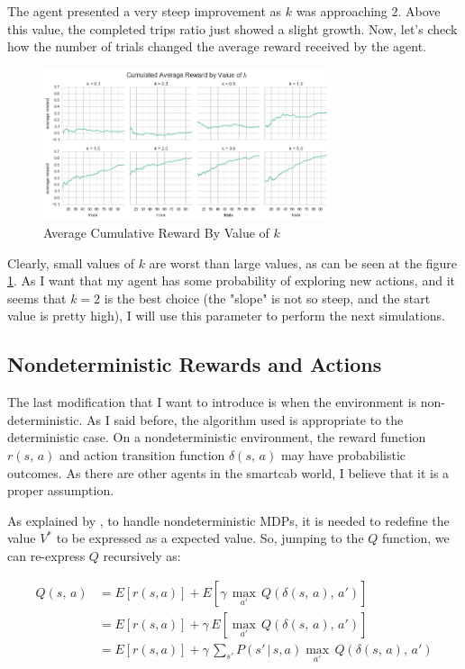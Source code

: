 \documentclass[a4paper]{article}
\begin{document}
\newpage
The agent presented a very steep improvement as $k$ was approaching $2$. Above this value, the completed trips ratio just showed a slight growth. Now, let's check how the number of trials changed the average reward received by the agent.

\begin{figure}[ht!]
\centering
\includegraphics[width=0.75\textwidth]{images/cum_reward_by_k.png}
\caption{\label{fig:cum_reward_by_k}Average Cumulative Reward By Value of $k$}
\end{figure}

Clearly, small values of $k$ are worst than large values, as can be seen at the figure \ref{fig:cum_reward_by_k}. As I want that my agent has some probability of exploring new actions, and it seems that $k=2$ is the best choice (the "slope" is not so steep, and the start value is pretty high), I will use this parameter to perform the next simulations.

\subsection{Nondeterministic Rewards and Actions}
The last modification that I want to introduce is when the environment is non-deterministic. As I said before, the algorithm used is appropriate to the deterministic case. On a nondeterministic environment, the reward function $r(s,\,a)$ and action transition function $\delta(s,\,a)$ may have probabilistic outcomes. As there are other agents in the smartcab world, I believe that it is a proper assumption.

As explained by \cite{Mitchell}, to handle nondeterministic MDPs, it is needed to redefine the value $V^{*}$ to be expressed as a expected value. So, jumping to the $Q$ function, we can re-express $Q$ recursively as:

\begin{equation}
\begin{aligned}
Q(s, \, a) &= E \left [r(s, a) \right ] + E \left [\gamma \, \underset{a'}{\max} \, Q(\delta(s,\, a), \, a')\right ]\\
&= E \left [r(s, a) \right ] + \gamma \,  E \left [\underset{a'}{\max} \, Q(\delta(s,\, a), \, a')\right ]\\
&= E \left [r(s, a) \right ] + \gamma \,  \sum_{s'} P\left(s' \,| \,s, a   \right) \underset{a'}{\max} \, Q(\delta(s,\, a), \, a')
\end{aligned}
\end{equation}
\end{document}
